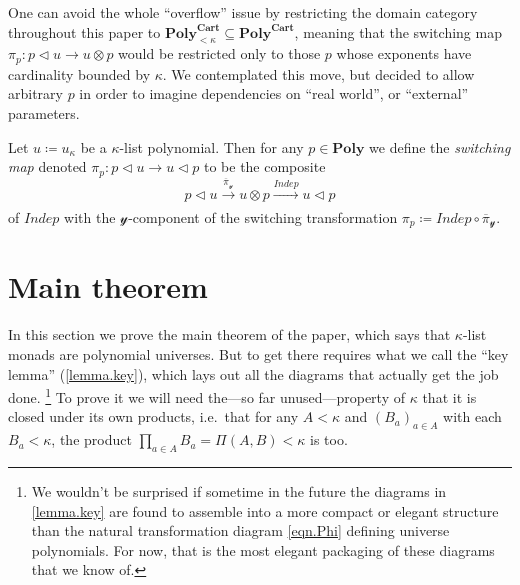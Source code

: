 \documentclass[11pt, one side, article]{memoir}
\theoremstyle{definition}
\theoremstyle{plain}
\newenvironment{definition}
  {\pushQED{\qed}\renewcommand{\qedsymbol}{$\lozenge$}\definitionx}
  {\popQED\enddefinitionx}
\renewcommand{\ss}{\subseteq}
\newcommand{\Cat}[1]{\mathbf{#1}}%
\newcommand{\Fun}[1]{\mathit{#1}}%
\newcommand{\To}[2][]{\xrightarrow[#1]{#2}}
\newcommand{\ol}[1]{\overline{#1}}
\newcommand{\yon}{\mathcal{y}}
\newcommand{\poly}{\Cat{Poly}}
\newcommand{\polycart}{\poly^{\Cat{Cart}}}
\newcommand{\0}{\textsf{0}}
\newcommand{\1}{\tn{\textsf{1}}}
\newcommand{\tri}{\mathbin{\triangleleft}}
\newcommand{\indep}{\Fun{Indep}}
\newcommand{\switch}{\pi}
\begin{document}
One can avoid the whole ``overflow'' issue by restricting the domain category throughout this paper to $\polycart_{<\kappa}\ss\polycart$, meaning that the switching map $\switch_p\colon p\tri u\to u\otimes p$ would be restricted only to those $p$ whose exponents have cardinality bounded by $\kappa$. We contemplated this move, but decided to allow arbitrary $p$ in order to imagine dependencies on ``real world'', or ``external'' parameters.

\begin{definition}[Switching map $\switch$]\label{def.switchmap}
Let $u\coloneqq u_\kappa$ be a $\kappa$-list polynomial. Then for any $p\in\poly$ we define the \emph{switching map} denoted $\switch_p\colon p\tri u\to u\tri p$ to be the composite
\[p\tri u\To{\ol{\pi}_\yon}u\otimes p\To{\indep}u\tri p\]
of $\indep$ with the $\yon$-component of the switching transformation $\pi_p\coloneqq\indep\circ\ol{\pi}_\yon$.
\end{definition}

\section{Main theorem}

In this section we prove the main theorem of the paper, which says that $\kappa$-list monads are polynomial universes. But to get there requires what we call the ``key lemma'' (\cref{lemma.key}), which lays out all the diagrams that actually get the job done.%
\footnote{We wouldn't be surprised if sometime in the future the diagrams in \cref{lemma.key} are found to assemble into a more compact or elegant structure than the natural transformation diagram \eqref{eqn.Phi} defining universe polynomials. For now, that is the most elegant packaging of these diagrams that we know of.}
To prove it we will need the---so far unused---property of $\kappa$ that it is closed under its own products, i.e.\ that for any $A<\kappa$ and $(B_a)_{a\in A}$ with each $B_a<\kappa$, the product $\prod_{a\in A}B_a=\Pi(A,B)<\kappa$ is too.
\end{document}
